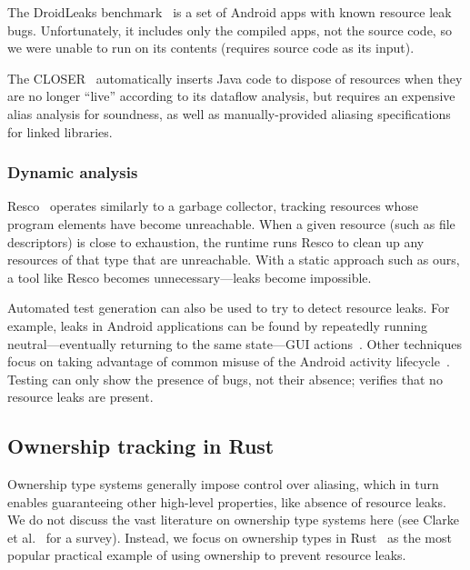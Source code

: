 The DroidLeaks benchmark~\cite{liu2019droidleaks} is a set of Android
apps with known resource leak bugs. Unfortunately, it includes only
the compiled apps, not the source code, so we were unable to run \Tool
on its contents (\Tool requires source code as its input).

The CLOSER~\cite{dillig2008closer} automatically inserts Java code to
dispose of resources when they are no longer ``live'' according to its
dataflow analysis, but requires an expensive alias analysis for
soundness, as well as manually-provided aliasing specifications for
linked libraries.


\subsubsection{Dynamic analysis}

Resco~\cite{dai2013resco} operates similarly to a garbage collector,
tracking resources whose program elements have become
unreachable. When a given resource (such as file descriptors) is close
to exhaustion, the runtime runs Resco to clean up any resources of
that type that are unreachable.  With a static approach such as ours,
a tool like Resco becomes unnecessary---leaks become impossible.

Automated test generation can also be used to try to detect resource
leaks. For example, leaks in Android applications can be found by
repeatedly running neutral---eventually returning to the same
state---GUI actions~\cite{wu2018sentinel,zhang2016automated}.
Other techniques focus on taking advantage of common misuse of
the Android activity lifecycle~\cite{amalfitano2020memories}.
Testing can only show the presence of bugs, not their absence;
\Tool verifies that no resource leaks are present.

\subsection{Ownership tracking in Rust}

Ownership type systems generally impose control over aliasing, which in turn
enables guaranteeing other high-level properties, like absence of resource
leaks.  We do not discuss the vast literature on ownership type systems here
(see Clarke et al.~\cite{clarke2013ownership} for a survey).  Instead, we focus
on ownership types in Rust~\cite{klabnik2018rust} as the most popular
practical example of using ownership to prevent resource leaks.

